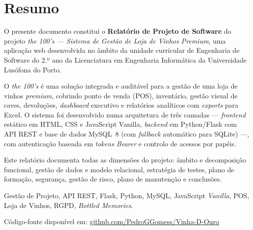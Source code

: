 \documentclass[11pt,a4paper]{report}
\begin{document}
\chapter*{Resumo}

O presente documento constitui o \textbf{Relatório de Projeto de Software} do projeto \textit{the 100's --- Sistema de Gestão de Loja de Vinhos Premium}, uma aplicação web desenvolvida no âmbito da unidade curricular de Engenharia de Software do 2.º ano da Licenciatura em Engenharia Informática da Universidade Lusófona do Porto.

O \textit{the 100's} é uma solução integrada e auditável para a gestão de uma loja de vinhos \textit{premium}, cobrindo ponto de venda (POS), inventário, gestão visual de caves, devoluções, \textit{dashboard} executivo e relatórios analíticos com \textit{exports} para Excel. O sistema foi desenvolvido numa arquitetura de três camadas --- \textit{frontend} estático em HTML, CSS e JavaScript Vanilla, \textit{backend} em Python/Flask com API REST e base de dados MySQL~8 (com \textit{fallback} automático para SQLite) ---, com autenticação baseada em \textit{tokens Bearer} e controlo de acessos por papéis.

Este relatório documenta todas as dimensões do projeto: âmbito e decomposição funcional, gestão de dados e modelo relacional, estratégia de testes, plano de formação, segurança, gestão de risco, plano de manutenção e conclusões.

\begin{infobox}
Gestão de Projeto, API REST, Flask, Python, MySQL, JavaScript \textit{Vanilla}, POS, Loja de Vinhos, RGPD, \textit{Bottled Memories}.
\end{infobox}

\begin{infobox}
Código-fonte disponível em: \href{https://github.com/PedroGGomess/Vinha-D-Ouro}{github.com/PedroGGomess/Vinha-D-Ouro}
\end{infobox}

\tableofcontents
\listoftables
\listoffigures

\clearpage
{}
\setcounter{page}{1}
\end{document}

